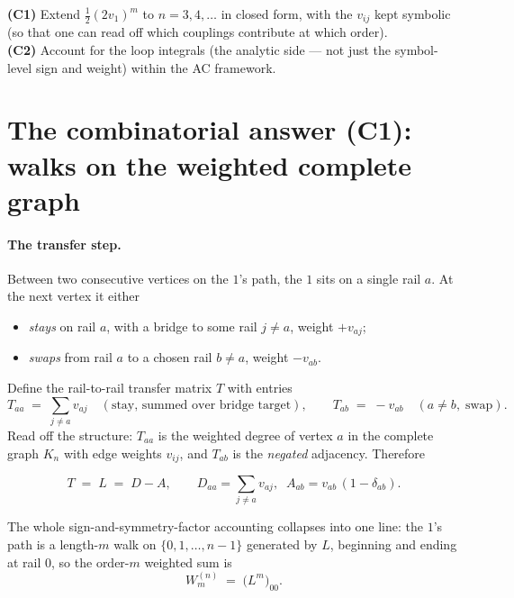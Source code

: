 \documentclass[11pt,a4paper]{article}
\begin{document}
\begin{commentbox}[title=The two challenges]
\textbf{(C1)}\; Extend $\tfrac12(2v_1)^m$ to $n=3,4,\dots$ in closed form,
with the $v_{ij}$ kept symbolic (so that one can read off which couplings
contribute at which order).\\[2pt]
\textbf{(C2)}\; Account for the loop integrals (the analytic side --- not
just the symbol-level sign and weight) within the AC framework.
\end{commentbox}

\section{The combinatorial answer (C1): walks on the weighted complete graph}

\paragraph{The transfer step.}
Between two consecutive vertices on the $1$'s path, the $1$ sits on a single
rail $a$. At the next vertex it either
\begin{itemize}[leftmargin=2em,itemsep=1pt]
  \item \emph{stays} on rail $a$, with a bridge to some rail $j\neq a$, weight $+v_{aj}$;
  \item \emph{swaps} from rail $a$ to a chosen rail $b\neq a$, weight $-v_{ab}$.
\end{itemize}
Define the rail-to-rail transfer matrix $T$ with entries
\[
T_{aa}\;=\;\sum_{j\neq a}v_{aj}\quad(\text{stay, summed over bridge target}),
\qquad
T_{ab}\;=\;-v_{ab}\quad(a\neq b,\;\text{swap}).
\]
Read off the structure: $T_{aa}$ is the weighted degree of vertex $a$ in the
complete graph $K_n$ with edge weights $v_{ij}$, and $T_{ab}$ is the
\emph{negated} adjacency. Therefore
\begin{commentbox}[title=The transfer matrix is the graph Laplacian]
\[
\boxed{\;T \;=\; L \;=\; D-A,\qquad
D_{aa}=\!\!\sum_{j\neq a}\!v_{aj},\;\; A_{ab}=v_{ab}\,(1-\delta_{ab}).\;}
\]
\end{commentbox}
The whole sign-and-symmetry-factor accounting collapses into one line: the
$1$'s path is a length-$m$ walk on $\{0,1,\dots,n-1\}$ generated by $L$,
beginning and ending at rail $0$, so the order-$m$ weighted sum is
\[
\boxed{\;W^{(n)}_m \;=\; \big(L^{m}\big)_{00}.\;}
\]
\end{document}

